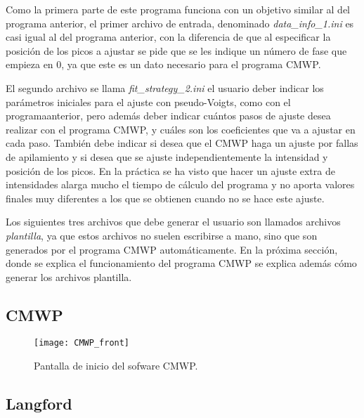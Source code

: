Como la primera parte de este programa funciona con un objetivo similar al del programa anterior, el primer archivo de entrada, denominado \textit{data\_info\_1.ini} es casi igual al del programa anterior, con la diferencia de que al especificar la posición de los picos a ajustar se pide que se les indique un número de fase que empieza en 0, ya que este es un dato necesario para el programa CMWP.

El segundo archivo se llama \textit{fit\_strategy\_2.ini} el usuario deber indicar los parámetros iniciales para el ajuste con pseudo-Voigts, como con el programaanterior, pero además deber indicar cuántos pasos de ajuste desea realizar con el programa CMWP, y cuáles son los coeficientes que va a ajustar en cada paso.
También debe indicar si desea que el CMWP haga un ajuste por fallas de apilamiento  y si desea que se ajuste independientemente la intensidad y posición de los picos.
En la práctica se ha visto que hacer un ajuste extra de intensidades alarga mucho el tiempo de cálculo del programa y no aporta valores finales muy diferentes a los que se obtienen cuando no se hace este ajuste.

Los siguientes tres archivos que debe generar el usuario son llamados archivos \textit{plantilla}, ya que estos archivos no suelen escribirse a mano, sino que son generados por el programa CMWP automáticamente.
En la próxima sección, donde se explica el funcionamiento del programa CMWP se explica además cómo generar los archivos plantilla.


\subsection{CMWP}\label{SS:CMWP}

\begin{figure}[!htb]
  \centering
  \texttt{[image: CMWP\_front]}
  \caption{Pantalla de inicio del sofware CMWP.}
  \label{fig:CMWP_front}
\end{figure}

\newpage
\subsection{Langford}\label{SS:02Langford}

